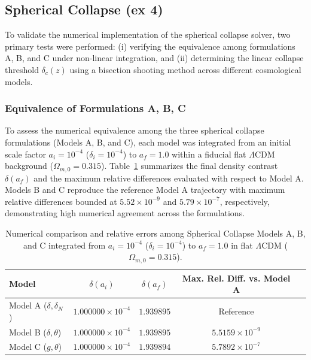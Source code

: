 \subsection{Spherical Collapse (ex 4)}

To validate the numerical implementation of the spherical collapse solver, two primary tests were performed: (i) verifying the equivalence among formulations A, B, and C under non-linear integration, and (ii) determining the linear collapse threshold $\delta_c(z)$ using a bisection shooting method across different cosmological models.

\subsubsection{Equivalence of Formulations A, B, C}

To assess the numerical equivalence among the three spherical collapse formulations (Models A, B, and C), each model was integrated from an initial scale factor $a_i = 10^{-4}$ ($\delta_i = 10^{-4}$) to $a_f = 1.0$ within a fiducial flat $\Lambda\mathrm{CDM}$ background ($\Omega_{m,0} = 0.315$). 
Table~\ref{tab:sc_equivalence} summarizes the final density contrast $\delta(a_f)$ and the maximum relative differences evaluated with respect to Model A. Models B and C reproduce the reference Model A trajectory with maximum relative differences bounded at $5.52 \times 10^{-9}$ and $5.79 \times 10^{-7}$, respectively, demonstrating high numerical agreement across the formulations.
    \begin{table}[htbp]
        \centering
        \caption{Numerical comparison and relative errors among Spherical Collapse Models A, B, and C integrated from $a_i = 10^{-4}$ ($\delta_i = 10^{-4}$) to $a_f = 1.0$ in flat $\Lambda$CDM ($\Omega_{m,0} = 0.315$).}
        \label{tab:sc_equivalence}
        \begin{tabular}{lcccc}
            \hline
            \textbf{Model} & $\delta(a_i)$ & $\delta(a_f)$ & \textbf{Max. Rel. Diff. vs. Model A} \\
            \hline
            Model A ($\delta, \delta_N$) & $1.000000 \times 10^{-4}$ & $1.939895$ & Reference \\
            Model B ($\delta, \theta$)   & $1.000000 \times 10^{-4}$ & $1.939895$ & $5.5159 \times 10^{-9}$ \\
            Model C ($g, \theta$)        & $1.000000 \times 10^{-4}$ & $1.939894$ & $5.7892 \times 10^{-7}$ \\
            \hline
        \end{tabular}
    \end{table}

